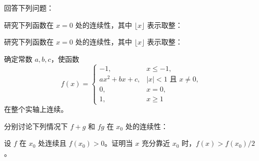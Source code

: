\newpage
\noindent\begin{minipage}{\textwidth}
回答下列问题：
\end{minipage}\par\vfill
\noindent\begin{minipage}{\textwidth}
研究下列函数在 $x=0$ 处的连续性，其中 $\lfloor x\rfloor$ 表示取整：
\end{minipage}\par\vfill
\noindent\begin{minipage}{\textwidth}
研究下列函数在 $x=0$ 处的连续性，其中 $\lfloor x\rfloor$ 表示取整：
\end{minipage}\par\vfill
\newpage
\noindent\begin{minipage}{\textwidth}
确定常数 $a,b,c$，使函数\[f(x)=\begin{cases}-1,&x\le-1,\\ax^2+bx+c,&|x|<1\text{ 且 }x\ne0,\\0,&x=0,\\1,&x\ge1\end{cases}\]在整个实轴上连续。
\end{minipage}\par\vfill
\noindent\begin{minipage}{\textwidth}
分别讨论下列情况下 $f+g$ 和 $fg$ 在 $x_0$ 处的连续性：
\end{minipage}\par\vfill
\noindent\begin{minipage}{\textwidth}
设 $f$ 在 $x_0$ 处连续且 $f(x_0)>0$。证明当 $x$ 充分靠近 $x_0$ 时，$f(x)>f(x_0)/2$。
\end{minipage}\par\vfill
